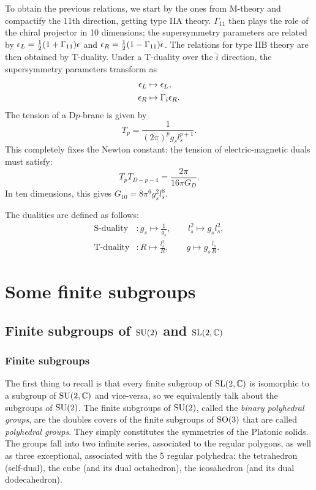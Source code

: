 \documentclass[a4paper,10pt]{article}
\begin{document}
    To obtain the previous relations, we start by the ones from M-theory and compactify the 11th direction, getting type IIA theory. $\Gamma_{11}$ then plays the role of the chiral projector in 10 dimensions; the supersymmetry parameters are related by $\epsilon_L=\frac{1}{2}(1+\Gamma_{11})\epsilon$ and $\epsilon_R=\frac{1}{2}(1-\Gamma_{11})\epsilon$. The relations for type IIB theory are then obtained by T-duality. Under a T-duality over the $\hat{i}$ direction, the supersymmetry parameters transform as
    \begin{align*}
        \epsilon_L &\mapsto \epsilon_L,\\
        \epsilon_R &\mapsto \Gamma_i\epsilon_R.
    \end{align*}
    The tension of a D$p$-brane is given by
    \begin{equation}
        T_{p} = \frac{1}{(2\pi)^pg_sl^{p+1}_s}.
    \end{equation}
    This completely fixes the Newton constant: the tension of electric-magnetic duals must satisfy:
    \begin{equation}
        T_pT_{D-p-4} = \frac{2\pi}{16\pi G_D}.
    \end{equation}
    In ten dimensions, this gives $G_{10}=8\pi^6g^2_sl^8_s$.

    The dualities are defined as follows:
    \begin{align*}
        \text{S-duality} &: g_s\mapsto\frac{1}{g_s},\qquad l^2_s\mapsto g_sl^2_s,\\
        \text{T-duality} &: R\mapsto\frac{l^2_s}{R},\qquad g\mapsto g_s\frac{l_s}{R}.
    \end{align*}

\section{Some finite subgroups}

    \subsection{Finite subgroups of $\text{SU}(2)$ and $\text{SL}(2,\mathbb{C})$}

        \subsubsection{Finite subgroups}

            The first thing to recall is that every finite subgroup of $\text{SL}(2,\mathbb{C})$ is isomorphic to a subgroup of $\text{SU}(2,\mathbb{C})$ and vice-versa, so we equivalently talk about the subgroups of $\text{SU}(2)$. The finite subgroups of $\text{SU}(2)$, called the \emph{binary polyhedral groups}, are the doubles covers of the finite subgroups of $\text{SO}(3)$ that are called \emph{polyhedral groups}. They simply constitutes the symmetries of the Platonic solids. The groups fall into two infinite series, associated to the regular polygons, as well as three exceptional, associated with the 5 regular polyhedra: the tetrahedron (self-dual), the cube (and its dual octahedron), the icosahedron (and its dual dodecahedron).
\end{document}

